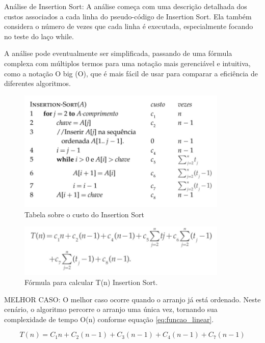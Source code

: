 
Análise de Insertion Sort: A análise começa com uma descrição detalhada dos custos associados a cada linha do pseudo-código de Insertion Sort. Ela também considera o número de vezes que cada linha é executada, especialmente focando no teste do laço while\cite{cormen2002}.

A análise pode eventualmente ser simplificada, passando de uma fórmula complexa com múltiplos termos para uma notação mais gerenciável e intuitiva, como a notação O big (O), que é mais fácil de usar para comparar a eficiência de diferentes algoritmos.

\begin{figure}[htbp]
    \centering
    \includegraphics[width = 10cm]{Imagens/Insertion Sort/custosINSERT.png}
    \caption{Tabela sobre o custo do Insertion Sort}
    \label{grafico_insert}
\end{figure}

\begin{figure}[h!]
    \centering
    \includegraphics[width = 10cm]{Imagens/Insertion Sort/formula.png}
    \caption{Fórmula para calcular T(n) Insertion Sort.}
    \label{grafico_insert}
\end{figure}



MELHOR CASO: O melhor caso ocorre quando o arranjo já está ordenado. Neste cenário, o algoritmo percorre o arranjo uma única vez, tornando sua complexidade de tempo O(n) conforme equação \eqref{eq:funcao_linear}. 

\begin{equation}
T(n) = C_1n + C_2(n-1) + C_3(n-1) + C_4(n-1) + C_7(n-1)
\end{equation}

